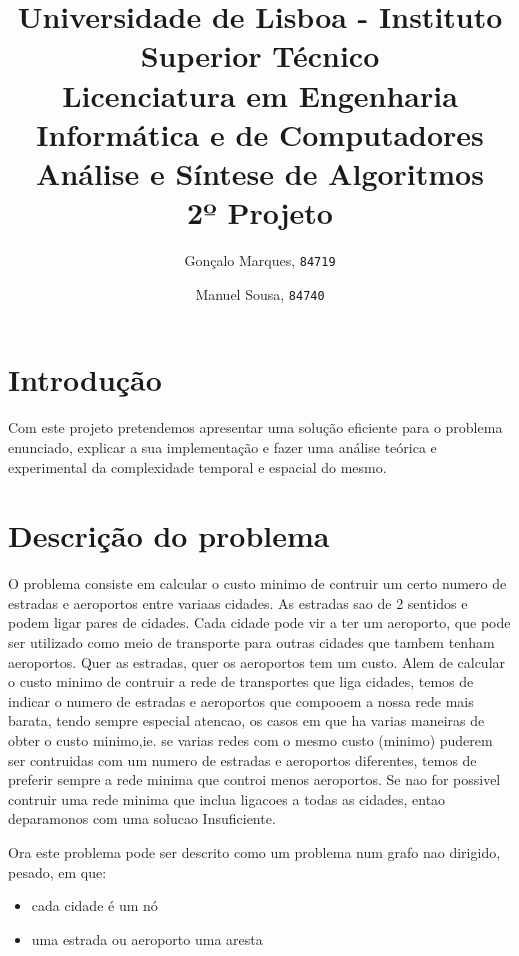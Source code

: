 \documentclass{scrartcl}
\begin{document}

\title{
	\textnormal{
	\LARGE Universidade de Lisboa - Instituto Superior Técnico\\
	\Large Licenciatura em Engenharia Informática e de Computadores\\
	\Large Análise e Síntese de Algoritmos
\\}
	\LARGE2º Projeto
	\vspace{-1ex}
	}
\author{Gonçalo Marques,
	\texttt{84719}
	\and
	Manuel Sousa,
	\texttt{84740}
}
\date{	\vspace{-1ex}
		\vspace{-4ex}
	}
\maketitle

\section*{Introdução}
Com este projeto pretendemos apresentar uma solução eficiente para o problema enunciado, explicar a sua implementação e fazer uma análise teórica e experimental da complexidade temporal e espacial do mesmo.

\section*{Descrição do problema}
O problema consiste em calcular o custo minimo de contruir um certo numero de estradas e aeroportos entre variaas cidades. As estradas sao de 2 sentidos e podem ligar pares de cidades. Cada cidade pode vir a ter um aeroporto, que pode ser utilizado como meio de transporte para outras cidades que tambem tenham aeroportos. Quer as estradas, quer os aeroportos tem um custo. Alem de calcular o custo minimo de contruir a rede de transportes que liga cidades, temos de indicar o numero de estradas e aeroportos que compooem a nossa rede mais barata, tendo sempre especial atencao, os casos em que ha varias maneiras de obter o custo minimo,ie. se varias redes com o mesmo custo (minimo) puderem ser contruidas com um numero de estradas e aeroportos diferentes, temos de preferir sempre a rede minima que controi menos aeroportos. Se nao for possivel contruir uma rede minima que inclua ligacoes a todas as cidades, entao deparamonos com uma solucao Insuficiente.

Ora este problema pode ser descrito como um problema num grafo nao dirigido, pesado, em que:
\begin{itemize}
\setlength\itemsep{-0.5ex}
\item cada cidade é um nó
\item uma estrada ou aeroporto uma aresta
\end{itemize}
\end{document}
